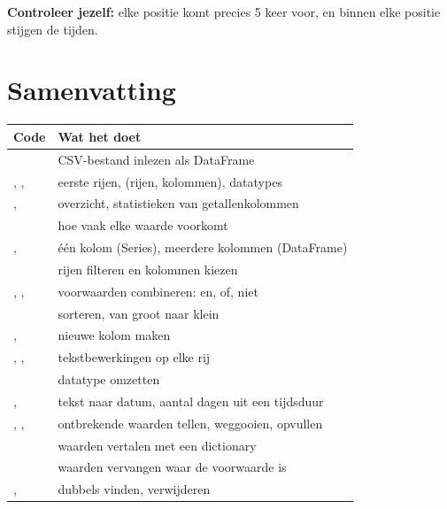 \documentclass[11pt,a4paper]{article}
\begin{document}
\textbf{Controleer jezelf:} elke positie komt precies 5 keer voor, en
binnen elke positie stijgen de tijden.

\section{Samenvatting}

\begin{center}
\begin{tabularx}{\textwidth}{@{}L{7.6cm}Y@{}}
\toprule
\textbf{Code} & \textbf{Wat het doet} \\
\midrule
{} & CSV-bestand inlezen als DataFrame \\
, ,  & eerste rijen, (rijen, kolommen), datatypes \\
,  & overzicht, statistieken van getallenkolommen \\
 & hoe vaak elke waarde voorkomt \\
,  & één kolom (Series), meerdere kolommen (DataFrame) \\
 & rijen filteren en kolommen kiezen \\
, \code{|}, \code{\textasciitilde} & voorwaarden combineren: en, of, niet \\
 & sorteren, van groot naar klein \\
,  & nieuwe kolom maken \\
, ,  & tekstbewerkingen op elke rij \\
 & datatype omzetten \\
,  & tekst naar datum, aantal dagen uit een tijdsduur \\
, ,  & ontbrekende waarden tellen, weggooien, opvullen \\
 & waarden vertalen met een dictionary \\
 & waarden vervangen waar de voorwaarde  is \\
,  & dubbels vinden, verwijderen \\
\bottomrule
\end{tabularx}
\end{center}
\end{document}
